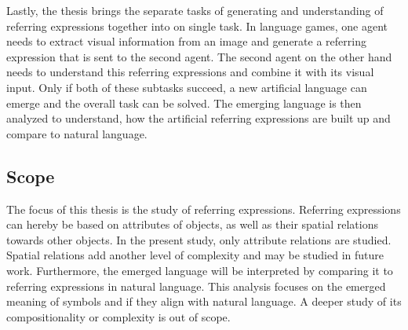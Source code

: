 Lastly, the thesis brings the separate tasks of generating and understanding of referring expressions together into on single task.
In language games, one agent needs to extract visual information from an image and generate a referring expression that is sent to the second agent.
The second agent on the other hand needs to understand this referring expressions and combine it with its visual input.
Only if both of these subtasks succeed, a new artificial language can emerge and the overall task can be solved.
The emerging language is then analyzed to understand, how the artificial referring expressions are built up and compare to natural language.

\subsection{Scope}
The focus of this thesis is the study of referring expressions.
Referring expressions can hereby be based on attributes of objects, as well as their spatial relations towards other objects.
In the present study, only attribute relations are studied.
Spatial relations add another level of complexity and may be studied in future work.
Furthermore, the emerged language will be interpreted by comparing it to referring expressions in natural language.
This analysis focuses on the emerged meaning of symbols and if they align with natural language.
A deeper study of its compositionality or complexity is out of scope.